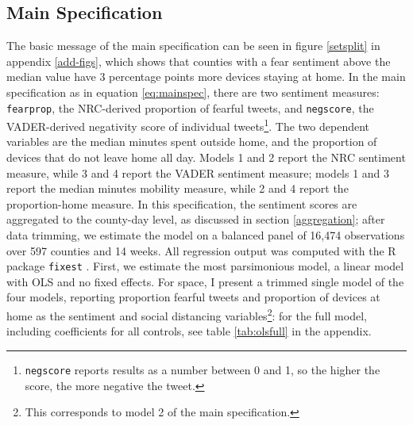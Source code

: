 \documentclass{article}
\begin{document}
\subsection{Main Specification}
The basic message of the main specification can be seen in figure \ref{setsplit} in appendix \ref{add-figs}, which shows that counties with a fear sentiment above the median value have 3 percentage points more devices staying at home. In the main specification as in equation \ref{eq:mainspec}, there are two sentiment measures: \texttt{fearprop}, the NRC-derived proportion of fearful tweets, and \texttt{negscore}, the VADER-derived negativity score of individual tweets\footnote{\texttt{negscore} reports results as a number between 0 and 1, so the higher the score, the more negative the tweet.}. The two dependent variables are the median minutes spent outside home, and the proportion of devices that do not leave home all day. Models 1 and 2 report the NRC sentiment measure, while 3 and 4 report the VADER sentiment measure; models 1 and 3 report the median minutes mobility measure, while 2 and 4 report the proportion-home measure. In this specification, the sentiment scores are aggregated to the county-day level, as discussed in section \ref{aggregation}; after data trimming, we estimate the model on a balanced panel of 16,474 observations over 597 counties and 14 weeks. All regression output was computed with the R package \texttt{fixest} \parencite{bergeEfficientEstimationMaximum2018}. First, we estimate the most parsimonious model, a linear model with OLS and no fixed effects. For space, I present a trimmed single model of the four models, reporting proportion fearful tweets and proportion of devices at home as the sentiment and social distancing variables\footnote{This corresponds to model 2 of the main specification.}: for the full model, including coefficients for all controls, see table \ref{tab:olsfull} in the appendix.
\end{document}
